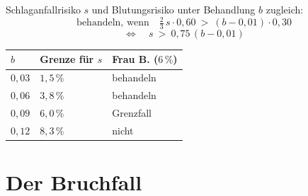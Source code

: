 \begin{merksatz}
Schlaganfallrisiko $s$ und Blutungsrisiko unter Behandlung $b$ zugleich:
\[ \text{behandeln, wenn} \quad \tfrac23\,s\cdot0{,}60 \ > \ (b-0{,}01)\cdot0{,}30 \]
\[ \Longleftrightarrow \quad s \ > \ 0{,}75\,(b - 0{,}01) \]

\begin{center}
{\small
\renewcommand{\arraystretch}{1.46}
\begin{tabular}{@{}P{2.4cm}P{2.6cm}P{2.6cm}@{}}
\toprule
$b$ & \textbf{Grenze für } $s$ & \textbf{Frau B. ($6\,\%$)}\\
\midrule
$0{,}03$ & $1{,}5\,\%$ & \textcolor{gruen}{behandeln}\\
$0{,}06$ & $3{,}8\,\%$ & \textcolor{gruen}{behandeln}\\
$0{,}09$ & $6{,}0\,\%$ & Grenzfall\\
$0{,}12$ & $8{,}3\,\%$ & \textcolor{akzent}{nicht}\\
\bottomrule
\end{tabular}}
\end{center}

\begin{center}
\begin{minipage}{0.88\textwidth}
\end{minipage}
\end{center}
\end{merksatz}

\section{Der Bruchfall}

